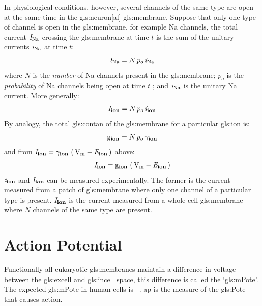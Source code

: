 \documentclass[class={myRUCProject}, crop=false]{standalone}
\begin{document}
In physiological conditions, however,  several channels of the same type are open at the same time in the \gls{gls:neuron}[al] \gls{gls:membrane}. Suppose that only one type of channel is open in the \gls{gls:membrane}, for example \gls{Na} channels, the total current \(\unit{\cur\sodium}\) crossing the \gls{gls:membrane} at time \(t\) is the sum of the unitary currents \(\unit{\uncur\sodium}\) at time \(t\):
\begin{equation}
    \unit{\cur\sodium} = N \, p_o \, \unit{\uncur\sodium}
\end{equation}
where \(N\) is the \emph{number} of \gls{Na} channels present in the \gls{gls:membrane}; \(p_o\) is the \emph{probability} of \gls{Na} channels being open at time \(t\)
; and \(\unit{\uncur\sodium}\) is the unitary \gls{Na} current.  \newline
More generally:
\begin{equation}
    \mathit{I}_\mathbf{ion}= N \, p_o \, \mathit{i}_\mathbf{ion}
\end{equation}
By analogy, the total \gls{gls:contan} of the \gls{gls:membrane} for a particular \gls{gls:ion} is: 
\begin{equation}
    \unit{\con\ion} = N \, p_o \, \uncon\ion
\end{equation}
and from \(\cur\ion= \uncon\ion \, \br{\unit{\V\membrane} - \equilibria\ion}\) above: 
\begin{equation}\label{eq:ionCurrent}
    \cur\ion= \unit{\con\ion} \, \br{\unit{\V\membrane} - \equilibria\ion}
\end{equation}
\(\mathit{i}_\mathbf{ion}\) and \(\mathit{I}_\mathbf{ion}\) can be measured experimentally. The former is the current measured from a patch of \gls{gls:membrane} where only one channel of a particular type is present. \(\mathit{I}_\mathbf{ion}\) is the current measured from a whole cell \gls{gls:membrane} where \(N\) channels of the same type are present. 
 
\section{Action Potential}

Functionally all eukaryotic \glspl{gls:membrane} maintain a difference in voltage between the \gls{gls:excell} and \gls{gls:incell} space, this difference is called the `\gls{gls:mPote}'. The expected \gls{gls:mPote} in human cells is ~\cite{}.
\gls{ap} is the measure of the \gls{gls:Pote} that causes action.
\end{document}
